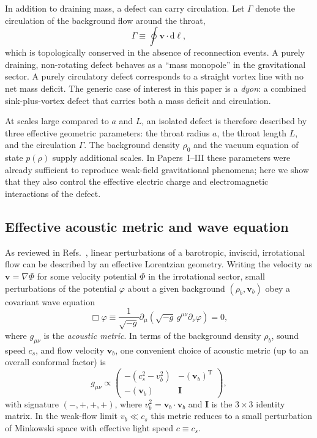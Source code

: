 \documentclass[11pt]{article}
\newcommand{\cS}{c_s}
\newcommand{\dd}{\mathrm{d}}
\newcommand{\Gam}{\Gamma}
\begin{document}
In addition to draining mass, a defect can carry circulation.  Let $\Gam$ denote the circulation of the background flow around the throat,
\begin{equation}
\Gam \equiv \oint \mathbf{v}\cdot\dd\boldsymbol{\ell},
\end{equation}
which is topologically conserved in the absence of reconnection events.  A purely draining, non-rotating defect behaves as a ``mass monopole'' in the gravitational sector.  A purely circulatory defect corresponds to a straight vortex line with no net mass deficit.  The generic case of interest in this paper is a \emph{dyon}: a combined sink-plus-vortex defect that carries both a mass deficit and circulation.

At scales large compared to $a$ and $L$, an isolated defect is therefore described by three effective geometric parameters: the throat radius $a$, the throat length $L$, and the circulation $\Gam$.  The background density $\rho_0$ and the vacuum equation of state $p(\rho)$ supply additional scales.  In Papers~I--III these parameters were already sufficient to reproduce weak-field gravitational phenomena; here we show that they also control the effective electric charge and electromagnetic interactions of the defect.

\subsection{Effective acoustic metric and wave equation}
\label{sec:model-acoustic}

As reviewed in Refs.~\cite{Norris:2025Orbits,Norris:Paper2,Norris:Paper3}, linear perturbations of a barotropic, inviscid, irrotational flow can be described by an effective Lorentzian geometry.  Writing the velocity as $\mathbf{v} = \nabla \Phi$ for some velocity potential $\Phi$ in the irrotational sector, small perturbations of the potential $\varphi$ about a given background $(\rho_b,\mathbf{v}_b)$ obey a covariant wave equation
\begin{equation}
\Box \varphi \equiv \frac{1}{\sqrt{-g}}\partial_\mu\left(\sqrt{-g}\,g^{\mu\nu}\partial_\nu \varphi\right) = 0,
\label{eq:acoustic-wave}
\end{equation}
where $g_{\mu\nu}$ is the \emph{acoustic metric}.  In terms of the background density $\rho_b$, sound speed $\cS$, and flow velocity $\mathbf{v}_b$, one convenient choice of acoustic metric (up to an overall conformal factor) is
\begin{equation}
g_{\mu\nu} \propto
\begin{pmatrix}
-(\cS^2 - v_b^2) & -(\mathbf{v}_b)^{\mathrm{T}} \\
-(\mathbf{v}_b) & \mathbf{I}
\end{pmatrix},
\label{eq:acoustic-metric}
\end{equation}
with signature $(-,+,+,+)$, where $v_b^2 = \mathbf{v}_b\cdot\mathbf{v}_b$ and $\mathbf{I}$ is the $3\times 3$ identity matrix.  In the weak-flow limit $v_b \ll \cS$ this metric reduces to a small perturbation of Minkowski space with effective light speed $c \equiv \cS$.
\end{document}
